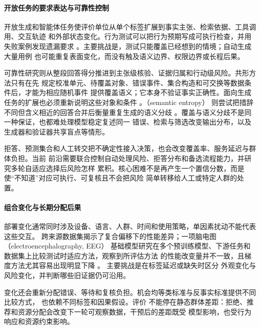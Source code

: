 \paragraph{开放任务的要求表达与可靠性控制}

开放生成和智能体任务使评价单位从单个标签扩展到事实主张、检索依据、工具调用、交互轨迹
和外部状态变化。行为测试可以把行为预期写成可执行检查，并用失败案例发现遗漏要求
。主要挑战是，测试只能覆盖已经想到的情境；自动生成大量用例
也可能重复表面变化，而没有触及语义边界、权限边界或长程后果。

可靠性研究则从整段回答得分推进到主张级核验、证据归属和行动级风险。共形方法只有在先
规定校准单元、待覆盖对象、错误事件、集合构造和可交换等数据条件后，才能为相应随机事件
提供覆盖语义；它本身不验证事实正确性。面向生成任务的扩展也必须重新说明这些对象和条件
。（semantic entropy）
则尝试把措辞不同但含义相近的回答合并后衡量重复生成的语义分歧
。覆盖与语义分歧不是同一种保证，也都难处理模型稳定复述同一
错误、检索与筛选改变输出分布，以及生成器和验证器共享盲点等情形。

拒答、预测集合和人工转交把不确定性接入决策，也会改变覆盖率、服务延迟与群体负担。当前
前沿需要联合控制自动处理风险、拒答分布和备选流程能力，并研究多轮自适应选择后风险怎样
累积。核心困难不是再产生一个置信分数，而是使“不知道”对应可执行、可复核且不会把风险
简单转移给人工或特定人群的处置。

\paragraph{组合变化与长期分配后果}

部署变化通常同时涉及设备、语言、人群、时间和使用策略，单因素扰动不能代表这些交互。
跨来源数据集揭示了复合偏移下的性能差异；一项脑电图（electroencephalography, EEG）
基础模型研究在多个预训练模型、下游任务和数据集上比较测试时适应方法，观察到所评估方法
的性能改变量并不一致，且梯度方法尤其容易出现明显下降
。
主要挑战是在标签延迟或缺失时区分
外观变化与风险变化，并判断哪些旧证据仍可沿用。

变化还会重新分配错误、等待和复核负担。机会均等类标准与反事实标准提供不同比较方式，
也依赖不同标签和因果假设。评价
不能停在静态群体差距：拒绝、推荐和资源分配会改变下一轮可观察数据，干预后的差距既受
模型影响，也受行为响应和资源约束影响。


